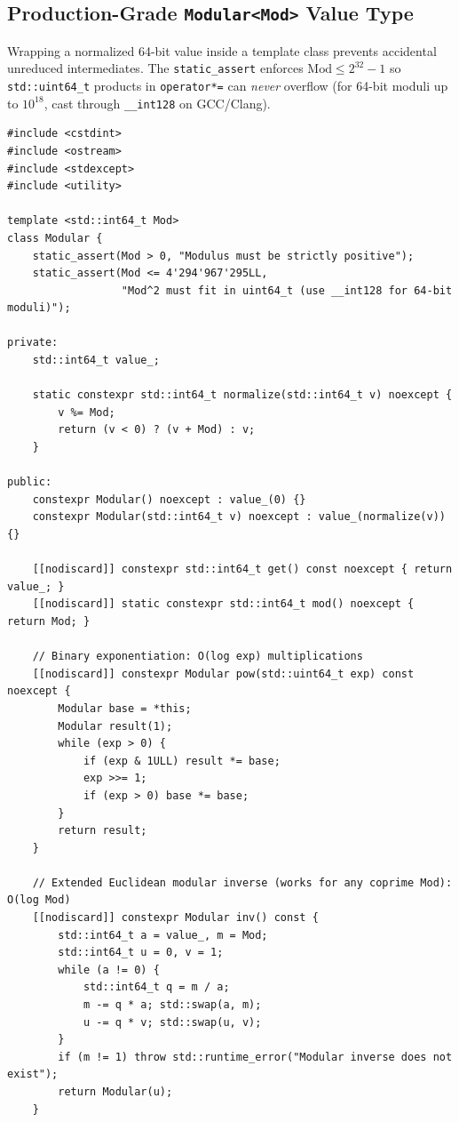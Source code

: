 \documentclass[11pt,a4paper]{article}
\theoremstyle{definition}
\begin{document}
\subsection{Production-Grade \texttt{Modular<Mod>} Value Type}

Wrapping a normalized 64-bit value inside a template class prevents accidental unreduced intermediates. The \texttt{static\_assert} enforces $\text{Mod} \le 2^{32} - 1$ so \texttt{std::uint64\_t} products in \texttt{operator*=} can \emph{never} overflow (for 64-bit moduli up to $10^{18}$, cast through \texttt{\_\_int128} on GCC/Clang).

\begin{lstlisting}[caption={Overflow-Checked C++23 Modular<Mod> Value Class}]
#include <cstdint>
#include <ostream>
#include <stdexcept>
#include <utility>

template <std::int64_t Mod>
class Modular {
    static_assert(Mod > 0, "Modulus must be strictly positive");
    static_assert(Mod <= 4'294'967'295LL,
                  "Mod^2 must fit in uint64_t (use __int128 for 64-bit moduli)");

private:
    std::int64_t value_;

    static constexpr std::int64_t normalize(std::int64_t v) noexcept {
        v %= Mod;
        return (v < 0) ? (v + Mod) : v;
    }

public:
    constexpr Modular() noexcept : value_(0) {}
    constexpr Modular(std::int64_t v) noexcept : value_(normalize(v)) {}

    [[nodiscard]] constexpr std::int64_t get() const noexcept { return value_; }
    [[nodiscard]] static constexpr std::int64_t mod() noexcept { return Mod; }

    // Binary exponentiation: O(log exp) multiplications
    [[nodiscard]] constexpr Modular pow(std::uint64_t exp) const noexcept {
        Modular base = *this;
        Modular result(1);
        while (exp > 0) {
            if (exp & 1ULL) result *= base;
            exp >>= 1;
            if (exp > 0) base *= base;
        }
        return result;
    }

    // Extended Euclidean modular inverse (works for any coprime Mod): O(log Mod)
    [[nodiscard]] constexpr Modular inv() const {
        std::int64_t a = value_, m = Mod;
        std::int64_t u = 0, v = 1;
        while (a != 0) {
            std::int64_t q = m / a;
            m -= q * a; std::swap(a, m);
            u -= q * v; std::swap(u, v);
        }
        if (m != 1) throw std::runtime_error("Modular inverse does not exist");
        return Modular(u);
    }


\end{lstlisting}
\end{document}
